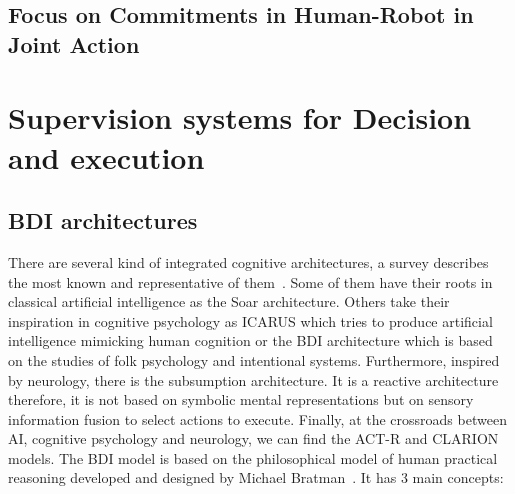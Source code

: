 \documentclass[a4paper,11pt,twoside]{StyleThese}
\begin{document}
\subsection{Focus on Commitments in Human-Robot in Joint Action}


\section{Supervision systems for Decision and execution}

\subsection{BDI architectures}
There are several kind of integrated cognitive architectures, a survey describes the most known and representative of them~\cite{chong_2007_integrated}. Some of them have their roots in classical artificial intelligence as the Soar architecture. Others take their inspiration in cognitive psychology as ICARUS  which tries to produce artificial intelligence mimicking human cognition or the BDI architecture which is based on the studies of folk psychology and intentional systems. Furthermore, inspired by neurology, there is the subsumption architecture. It is a reactive architecture therefore, it is not based on symbolic mental representations but on sensory information fusion to select actions to execute. Finally, at the crossroads between AI, cognitive psychology and neurology, we can find the ACT-R and CLARION models.	
The BDI model is based on the philosophical model of human practical reasoning developed and designed by Michael Bratman~\cite{bratman_1987_intention,bratman_1988_plans}. It has 3 main concepts:
\end{document}
